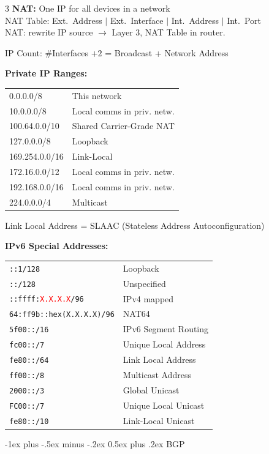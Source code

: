 \documentclass[10pt,landscape]{article}
\makeatletter
\renewcommand{\section}{\@startsection{section}{1}{0mm}%
                                {-1ex plus -.5ex minus -.2ex}%
                                {0.5ex plus .2ex}%
                                {\normalfont\large\bfseries}}
\makeatother
\begin{document}
\begin{multicols}{3}
\textbf{NAT:} One IP for all devices in a network\\
NAT Table: Ext.\ Address $|$ Ext.\ Interface $|$ Int.\ Address $|$ Int.\ Port\\
NAT: rewrite IP source $\rightarrow$ Layer 3, NAT Table in router.

IP Count: \#Interfaces $+ 2$ = Broadcast + Network Address

\textbf{Private IP Ranges:}\\
{\footnotesize
\begin{tabular}{ll}
0.0.0.0/8 & This network\\
10.0.0.0/8 & Local comms in priv. netw.\\
100.64.0.0/10 & Shared Carrier-Grade NAT\\
127.0.0.0/8 & Loopback\\
169.254.0.0/16 & Link-Local\\
172.16.0.0/12 & Local comms in priv. netw.\\
192.168.0.0/16 & Local comms in priv. netw.\\
224.0.0.0/4 & Multicast\\
\end{tabular}
}

Link Local Address = SLAAC (Stateless Address Autoconfiguration)

\textbf{IPv6 Special Addresses:}\\
{\footnotesize
\begin{tabular}{ll}
\texttt{::1/128} & Loopback\\
\texttt{::/128} & Unspecified\\
\texttt{::ffff:\textcolor{red}{X.X.X.X}/96} & IPv4 mapped\\
\texttt{64:ff9b::hex(X.X.X.X)/96} & NAT64\\
\texttt{5f00::/16} & IPv6 Segment Routing\\
\texttt{fc00::/7} & Unique Local Address\\
\texttt{fe80::/64} & Link Local Address\\
\texttt{ff00::/8} & Multicast Address\\
\texttt{2000::/3} & Global Unicast\\
\texttt{FC00::/7} & Unique Local Unicast\\
\texttt{fe80::/10} & Link-Local Unicast\\
\end{tabular}
}

\section{BGP}


\end{multicols}
\end{document}
